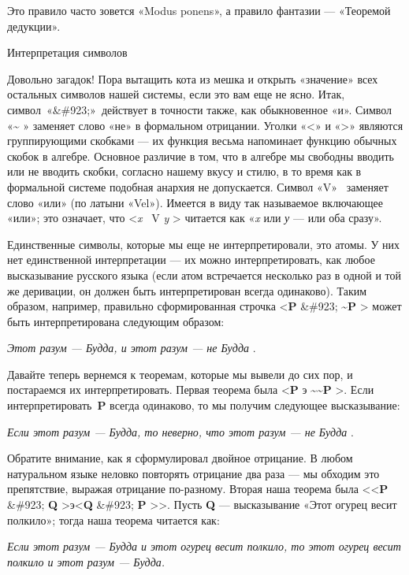 Это правило часто зовется «Modus ponens», а правило фантазии --- «Теоремой дедукции».

Интерпретация символов

Довольно загадок! Пора вытащить кота из мешка и открыть «значение» всех остальных символов нашей системы, если это вам еще не ясно. Итак, символ~«\&\#923;»~действует в точности также, как обыкновенное «и». Символ «\textbf{\textasciitilde{}} » заменяет слово «не» в формальном отрицании. Уголки «\textless» и «\textgreater» являются группирующими скобками --- их функция весьма напоминает функцию обычных скобок в алгебре. Основное различие в том, что в алгебре мы свободны вводить или не вводить скобки, согласно нашему вкусу и стилю, в то время как в формальной системе подобная анархия не допускается. Символ «V»~ заменяет слово «или» (по латыни «Vel»). Имеется в виду так называемое включающее «или»; это означает, что \textless{}\emph{x} ~V \emph{y} \textgreater{} читается как «\emph{x} или \emph{у} --- или оба сразу».

Единственные символы, которые мы еще не интерпретировали, это атомы. У них нет единственной интерпретации --- их можно интерпретировать, как любое высказывание русского языка (если атом встречается несколько раз в одной и той же деривации, он должен быть интерпретирован всегда одинаково). Таким образом, например, правильно сформированная строчка \textless{}\textbf{P} \&\#923; \textbf{\textasciitilde P} \textgreater{} может быть интерпретирована следующим образом:

\emph{Этот разум --- Будда, и этот разум --- не Будда} .

Давайте теперь вернемся к теоремам, которые мы вывели до сих пор, и постараемся их интерпретировать. Первая теорема была \textless{}\textbf{P} э \textbf{\textasciitilde\textasciitilde P} \textgreater. Если интерпретировать~\textbf{P} всегда одинаково, то мы получим следующее высказывание:

\emph{Если этот разум --- Будда, то неверно, что этот разум --- не Будда} .

Обратите внимание, как я сформулировал двойное отрицание. В любом натуральном языке неловко повторять отрицание два раза --- мы обходим это препятствие, выражая отрицание по-разному. Вторая наша теорема была \textless\textless{}\textbf{P} \&\#923; \textbf{Q} \textgreater э\textless{}\textbf{Q} \&\#923; \textbf{P} \textgreater\textgreater. Пусть \textbf{Q} --- высказывание «Этот огурец весит полкило»; тогда наша теорема читается как:

\emph{Если этот разум --- Будда и этот огурец весит полкило, то этот огурец весит полкило и этот разум --- Будда.}

